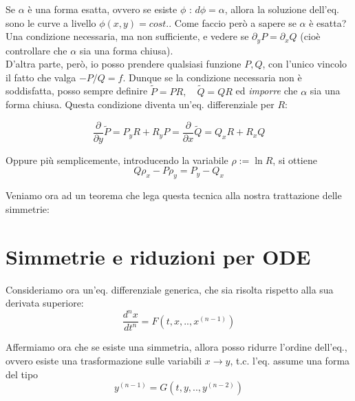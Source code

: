 \documentclass{report}
\begin{document}
Se $\alpha $ è una forma esatta, ovvero se esiste $\phi$ : $d\phi = \alpha$, allora la soluzione dell'eq. sono le curve a livello $\phi(x, y) = cost. $. Come faccio però a sapere se $\alpha$ è esatta? Una condizione necessaria, ma non sufficiente, e vedere se $\partial_y P = \partial_x Q$ (cioè controllare che $\alpha$ sia una forma chiusa). \\

D'altra parte, però, io posso prendere qualsiasi funzione $P, Q$, con l'unico vincolo il fatto che valga $-P/Q = f$. Dunque se la condizione necessaria non è soddisfatta, posso sempre definire $\tilde{P} = PR, \quad \tilde{Q} = QR$ ed \emph{imporre} che $\alpha$ sia una forma chiusa. Questa condizione diventa un'eq. differenziale per $R$: 

\begin{equation}
    \frac{\partial}{\partial y}\tilde{P} = P_yR + R_yP = \frac{\partial}{\partial x}\tilde{Q} = Q_xR + R_xQ
\end{equation}

Oppure più semplicemente, introducendo la variabile $\rho := \ln{R}$, si ottiene
\begin{equation}
    Q\rho_x - P\rho_y = P_y - Q_x
\end{equation}

Veniamo ora ad un teorema che lega questa tecnica alla nostra trattazione delle simmetrie: 


\section{Simmetrie e riduzioni per ODE}

Consideriamo ora un'eq. differenziale generica, che sia risolta rispetto alla sua derivata superiore:
\begin{equation}
    \frac{d^nx}{dt^n} = F(t,x, .., x^{(n-1)})
\end{equation}

Affermiamo ora che se esiste una simmetria, allora posso ridurre l'ordine dell'eq., ovvero esiste una trasformazione sulle variabili $x \rightarrow y$, t.c. l'eq. assume una forma del tipo 
\begin{equation}
    y^{(n-1)} = G(t, y, .., y^{(n-2)})
\end{equation}
\end{document}
